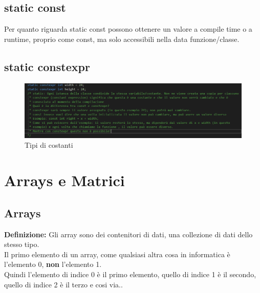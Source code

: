 \subsection{static const}

\textsf{\small Per quanto riguarda \color{myblue2} static const \normalcolor possono ottenere un valore a compile time o a runtime, proprio come \color{myblue2} const, \normalcolor ma solo accessibili nella data funzione/classe.}\\

\subsection{static constexpr}


\begin{figure}[ht]
	\centering
	\includegraphics[width=1\textwidth, height=1\textheight, keepaspectratio]{./imgs/constexpr_e_const_differenze.png}
	\caption{Tipi di costanti}
	\label{fig:constants}
\end{figure}


\section{Arrays e Matrici}

\subsection{Arrays}

\textsf{\small \textbf{Definizione: } Gli array sono dei contenitori di dati, una collezione di dati dello stesso tipo.} \\

\textsf{\small Il primo elemento di un array, come qualsiasi altra cosa in informatica è l'elemento 0, \textbf{non} l'elemento 1.}\\

\textsf{\small Quindi l'elemento di indice 0 è il primo elemento, quello di indice 1 è il secondo, quello di indice 2 è il terzo e cosi via..} \\

